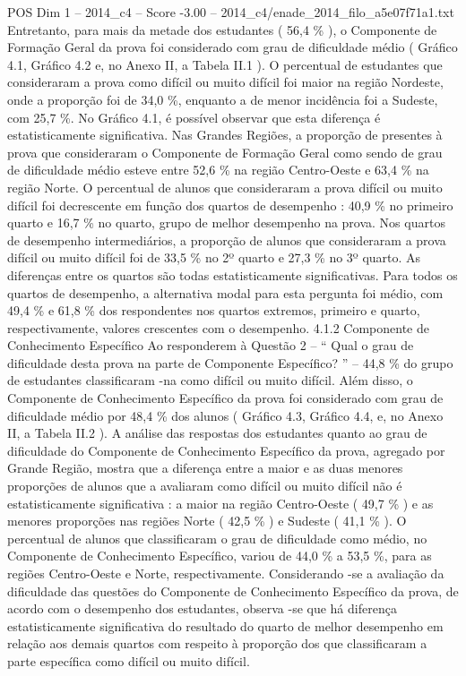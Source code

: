\begin{textsample}{POS Dim 1 – 2014\_c4 – Score -3.00 – 2014\_c4/enade\_2014\_filo\_a5e07f71a1.txt}
Entretanto, para mais da metade dos estudantes ( 56,4 \% ), o Componente de Formação Geral da prova foi considerado com grau de dificuldade médio ( Gráfico 4.1, Gráfico 4.2 e, no Anexo II, a Tabela II.1 ).
O percentual de estudantes que consideraram a prova como difícil ou muito difícil foi maior na região Nordeste, onde a proporção foi de 34,0 \%, enquanto a de menor incidência foi a Sudeste, com 25,7 \%.
No Gráfico 4.1, é possível observar que esta diferença é estatisticamente significativa.
Nas Grandes Regiões, a proporção de presentes à prova que consideraram o Componente de Formação Geral como sendo de grau de dificuldade médio esteve entre 52,6 \% na região Centro-Oeste e 63,4 \% na região Norte.
O percentual de alunos que consideraram a prova difícil ou muito difícil foi decrescente em função dos quartos de desempenho : 40,9 \% no primeiro quarto e 16,7 \% no quarto, grupo de melhor desempenho na prova.
Nos quartos de desempenho intermediários, a proporção de alunos que consideraram a prova difícil ou muito difícil foi de 33,5 \% no 2º quarto e 27,3 \% no 3º quarto.
As diferenças entre os quartos são todas estatisticamente significativas.
Para todos os quartos de desempenho, a alternativa modal para esta pergunta foi médio, com 49,4 \% e 61,8 \% dos respondentes nos quartos extremos, primeiro e quarto, respectivamente, valores crescentes com o desempenho. 4.1.2 Componente de Conhecimento Específico Ao responderem à Questão 2 – “ Qual o grau de dificuldade desta prova na parte de Componente Específico? ” – 44,8 \% do grupo de estudantes classificaram -na como difícil ou muito difícil.
Além disso, o Componente de Conhecimento Específico da prova foi considerado com grau de dificuldade médio por 48,4 \% dos alunos ( Gráfico 4.3, Gráfico 4.4, e, no Anexo II, a Tabela II.2 ).
A análise das respostas dos estudantes quanto ao grau de dificuldade do Componente de Conhecimento Específico da prova, agregado por Grande Região, mostra que a diferença entre a maior e as duas menores proporções de alunos que a avaliaram como difícil ou muito difícil não é estatisticamente significativa : a maior na região Centro-Oeste ( 49,7 \% ) e as menores proporções nas regiões Norte ( 42,5 \% ) e Sudeste ( 41,1 \% ).
O percentual de alunos que classificaram o grau de dificuldade como médio, no Componente de Conhecimento Específico, variou de 44,0 \% a 53,5 \%, para as regiões Centro-Oeste e Norte, respectivamente.
Considerando -se a avaliação da dificuldade das questões do Componente de Conhecimento Específico da prova, de acordo com o desempenho dos estudantes, observa -se que há diferença estatisticamente significativa do resultado do quarto de melhor desempenho em relação aos demais quartos com respeito à proporção dos que classificaram a parte específica como difícil ou muito difícil.

\end{textsample}
